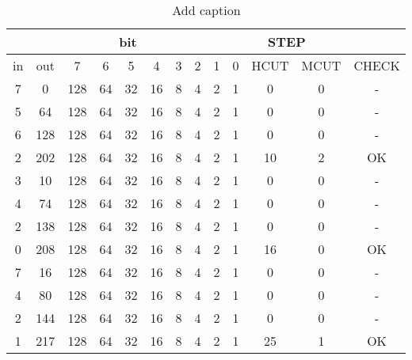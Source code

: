 \begin{table}[htbp]
	\centering
	\caption{Add caption}
	\begin{tabular}{|c|c|c|c|c|c|c|c|c|c|c|c|c|}
		\hline
		\rowcolor[rgb]{ .949,  .949,  .949} \multicolumn{2}{|c|}{IO} & \multicolumn{8}{c|}{bit}                                      & \multicolumn{3}{c|}{STEP} \bigstrut\\
		\hline
		\rowcolor[rgb]{ .949,  .949,  .949} in    & out   & 7     & 6     & 5     & 4     & 3     & 2     & 1     & 0     & HCUT  & MCUT  & \multicolumn{1}{l|}{CHECK} \bigstrut\\
		\hline
		7     & 0     & 128   & 64    & 32    & 16    & 8     & 4     & 2     & 1     & 0     & 0     & - \bigstrut\\
		\hline
		5     & 64    & 128   & 64    & 32    & 16    & 8     & 4     & 2     & 1     & 0     & 0     & - \bigstrut\\
		\hline
		6     & 128   & 128   & 64    & 32    & 16    & 8     & 4     & 2     & 1     & 0     & 0     & - \bigstrut\\
		\hline
		2     & 202   & 128   & 64    & 32    & 16    & 8     & 4     & 2     & 1     & 10    & 2     & OK \bigstrut\\
		\hline
		3     & 10    & 128   & 64    & 32    & 16    & 8     & 4     & 2     & 1     & 0     & 0     & - \bigstrut\\
		\hline
		4     & 74    & 128   & 64    & 32    & 16    & 8     & 4     & 2     & 1     & 0     & 0     & - \bigstrut\\
		\hline
		2     & 138   & 128   & 64    & 32    & 16    & 8     & 4     & 2     & 1     & 0     & 0     & - \bigstrut\\
		\hline
		0     & 208   & 128   & 64    & 32    & 16    & 8     & 4     & 2     & 1     & 16    & 0     & OK \bigstrut\\
		\hline
		7     & 16    & 128   & 64    & 32    & 16    & 8     & 4     & 2     & 1     & 0     & 0     & - \bigstrut\\
		\hline
		4     & 80    & 128   & 64    & 32    & 16    & 8     & 4     & 2     & 1     & 0     & 0     & - \bigstrut\\
		\hline
		2     & 144   & 128   & 64    & 32    & 16    & 8     & 4     & 2     & 1     & 0     & 0     & - \bigstrut\\
		\hline
		1     & 217   & 128   & 64    & 32    & 16    & 8     & 4     & 2     & 1     & 25    & 1     & OK \bigstrut\\

\end{tabular}
\end{table}
